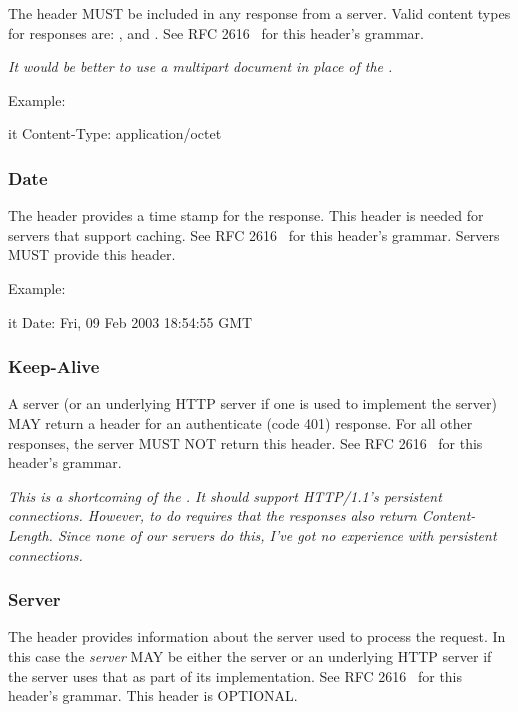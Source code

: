 \documentclass[justify]{dods-paper}
\begin{document}
The  header MUST be included in any response from a
\DAP server. Valid content types for \DAP responses are:
,  and .  See
RFC 2616~\cite{rfc2616} for this header's grammar.

\emph{It would be better to use a multipart
  document in place of the .} 

Example:

\begin{vcode}{it}
Content-Type: application/octet
\end{vcode}

\subsubsection{Date}

The  header provides a time stamp for the response. This header
is needed for servers that support caching. See RFC 2616~\cite{rfc2616}
for this header's grammar. Servers MUST provide this header.

Example:

\begin{vcode}{it}
Date: Fri, 09 Feb 2003 18:54:55 GMT
\end{vcode}

\subsubsection{Keep-Alive}

A \DAP server (or an underlying HTTP server if one is used to
implement the \DAP server) MAY return a  header for an
authenticate (code 401) response. For all other responses, the \DAP
server MUST NOT return this header. See
RFC 2616~\cite{rfc2616} for this header's grammar.

\emph{This is a shortcoming of the \DAP. It should support HTTP/1.1's
  persistent connections. However, to do requires that the responses
  also return Content-Length. Since none of our servers do this, I've
  got no experience with persistent connections.}

\subsubsection{Server}

The  header provides information about the server used to
process the request. In this case the \emph{server} MAY be either the
\DAP server or an underlying HTTP server if the \DAP server uses
that as part of its implementation. See RFC 2616~\cite{rfc2616}
for this header's grammar. This header is OPTIONAL.
\end{document}
